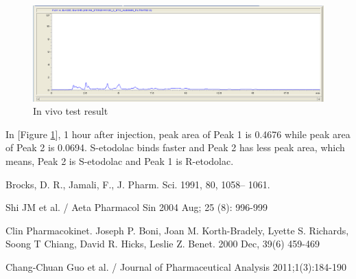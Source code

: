 \documentclass[12pt]{article} %
\begin{document}
\begin{figure}[h!]
  \centering
  \includegraphics[width=\linewidth]{fig8.png}
  \caption{In vivo test result}
  \label{fig:fig8}
\end{figure}

 In [Figure \ref{fig:fig8}],  1 hour after injection, peak area of Peak 1 is 0.4676 while peak area of Peak 2 is 0.0694. S-etodolac binds faster and Peak 2 has less peak area, which means, Peak 2 is S-etodolac and Peak 1 is R-etodolac.



\newpage

\begin{thebibliography}{100}
	Brocks, D. R., Jamali, F., J. Pharm. Sci. 1991, 80, 1058– 1061.


        Shi JM et al. / Aeta Pharmacol Sin 2004 Aug; 25 (8): 996-999

        Clin Pharmacokinet. Joseph P. Boni, Joan M. Korth-Bradely, Lyette S. Richards, Soong T Chiang, David R. Hicks, Leslie Z. Benet. 2000 Dec, 39(6) 459-469

	Chang-Chuan Guo et al. / Journal of Pharmaceutical Analysis  2011;1(3):184-190

\end{thebibliography}
\end{document}
